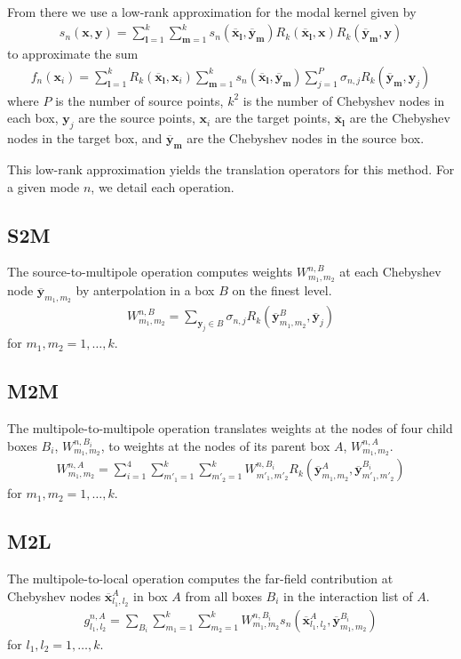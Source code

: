 \documentclass[11pt, oneside]{article}   	%
\begin{document}
From there we use a low-rank approximation for the modal kernel given by
\begin{align}
s_n(\mathbf{x},\mathbf{y}) = \sum_{\mathbf{l}=1}^k\sum_{\mathbf{m}=1}^k s_n(\mathbf{\overline{x}}_{\mathbf{l}},\mathbf{\overline{y}}_{\mathbf{m}})R_k(\mathbf{\overline{x}}_{\mathbf{l}},\mathbf{x})R_k(\mathbf{\overline{y}}_{\mathbf{m}},\mathbf{y})
\end{align}
to approximate the sum
\begin{align}
f_n(\mathbf{x}_i)=\sum_{\mathbf{l}=1}^k R_k(\mathbf{\overline{x}}_{\mathbf{l}},\mathbf{x}_i) \sum_{\mathbf{m}=1}^k s_n(\mathbf{\overline{x}}_{\mathbf{l}},\mathbf{\overline{y}}_{\mathbf{m}}) \sum_{j=1}^P \sigma_{n,j}R_k(\mathbf{\overline{y}}_{\mathbf{m}},\mathbf{y}_j)
\end{align}
where $P$ is the number of source points, $k^2$ is the number of Chebyshev nodes in each box, $\mathbf{y}_j$ are the source points, $\mathbf{x}_i$ are the target points, $\mathbf{\overline{x}}_{\mathbf{l}}$ are the Chebyshev nodes in the target box, and $\mathbf{\overline{y}}_{\mathbf{m}}$ are the Chebyshev nodes in the source box.

This low-rank approximation yields the translation operators for this method. For a given mode $n$, we detail each operation.
\subsection{S2M}
The source-to-multipole operation computes weights $W^{n,B}_{m_1,m_2}$ at each Chebyshev node $\mathbf{\overline{y}}_{m_1,m_2}$ by anterpolation in a box $B$ on the finest level.
\begin{align}
W_{m_1,m_2}^{n,B} = \sum_{\mathbf{y}_j\in B} \sigma_{n,j} R_k(\mathbf{\overline{y}}^B_{m_1,m_2},\mathbf{\overline{y}}_j)
\end{align}
for $m_1,m_2 = 1,\dots,k$.
\subsection{M2M}
The multipole-to-multipole operation translates weights at the nodes of four child boxes $B_i$, $W_{m_1,m_2}^{n,B_i}$, to weights at the nodes of its parent box $A$, $W_{m_1,m_2}^{n,A}$.
\begin{align}
W_{m_1,m_2}^{n,A} = \sum_{i=1}^4 \sum_{m'_1=1}^k\sum_{m'_2=1}^k W_{m'_1,m'_2}^{n,B_i} R_k(\mathbf{\overline{y}}^A_{m_1,m_2},\mathbf{\overline{y}}^{B_i}_{m'_1,m'_2})
\end{align}
for $m_1,m_2= 1,\dots,k$.
\subsection{M2L}
The multipole-to-local operation computes the far-field contribution at Chebyshev nodes $\mathbf{\overline{x}}_{l_1,l_2}^A$ in box $A$ from all boxes $B_i$ in the interaction list of $A$.
\begin{align}
g_{l_1,l_2}^{n,A} = \sum_{B_i} \sum_{m_1=1}^k\sum_{m_2=1}^k W_{m_1,m_2}^{n,B_i} s_n(\mathbf{\overline{x}}^{A}_{l_1,l_2},\mathbf{\overline{y}}^{B_i}_{m_1,m_2})
\end{align}
for $l_1,l_2 = 1,\dots,k$.
\end{document}
